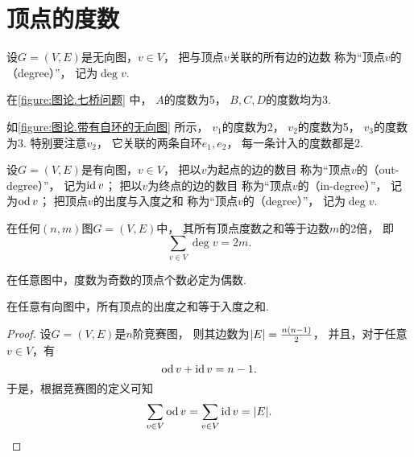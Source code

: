 \section{顶点的度数}
\begin{definition}
设\(G = (V,E)\)是无向图，\(v \in V\)，
把与顶点\(v\)关联的所有边的边数
称为“顶点\(v\)的（degree）”，
记为\(\deg v\).
\end{definition}

在\cref{figure:图论.七桥问题} 中，
\(A\)的度数为5，
\(B,C,D\)的度数均为3.

如\cref{figure:图论.带有自环的无向图} 所示，
\(v_1\)的度数为2，
\(v_2\)的度数为5，
\(v_3\)的度数为3.
特别要注意\(v_2\)，
它关联的两条自环\(e_1,e_2\)，
每一条计入的度数都是2.

\begin{definition}
设\(G = (V,E)\)是有向图，\(v \in V\)，
把以\(v\)为起点的边的数目
称为“顶点\(v\)的（out-degree）”，
记为\(\operatorname{id} v\)；
把以\(v\)为终点的边的数目
称为“顶点\(v\)的（in-degree）”，
记为\(\operatorname{od} v\)；
把顶点\(v\)的出度与入度之和
称为“顶点\(v\)的（degree）”，
记为\(\deg v\).
\end{definition}

\begin{theorem}\label{theorem:图论.握手定理}
在任何\((n,m)\)图\(G = (V,E)\)中，
其所有顶点度数之和等于边数\(m\)的2倍，
即\begin{equation*}
	\sum_{v \in V} \deg v = 2m.
\end{equation*}
\end{theorem}

\begin{corollary}\label{theorem:图论.握手定理.推论}
在任意图中，度数为奇数的顶点个数必定为偶数.
\end{corollary}

\begin{theorem}
在任意有向图中，所有顶点的出度之和等于入度之和.
\begin{proof}
设\(G = (V,E)\)是\(n\)阶竞赛图，
则其边数为\(\abs{E} = \frac{n(n-1)}2\)，
并且，对于任意\(v \in V\)，有\begin{equation*}
	\operatorname{od} v + \operatorname{id} v = n-1.
\end{equation*}
于是，根据竞赛图的定义可知\begin{equation*}
	\sum_{v \in V} \operatorname{od} v
	= \sum_{v \in V} \operatorname{id} v
	= \abs{E}.
	\qedhere
\end{equation*}
\end{proof}
\end{theorem}

